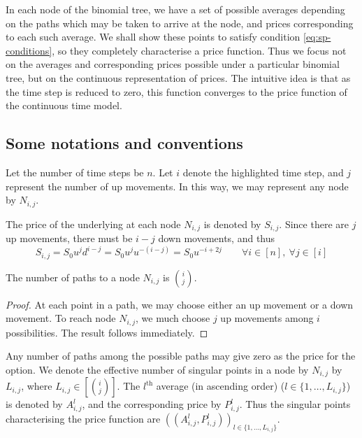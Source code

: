 In each node of the binomial tree, we have a set of possible averages depending on the paths which may be taken to arrive at the node, and prices corresponding to each such average. We shall show these points to satisfy condition \ref{eq:sp-conditions}, so they completely characterise a price function. Thus we focus not on the averages and corresponding prices possible under a particular binomial tree, but on the continuous representation of prices. The intuitive idea is that as the time step is reduced to zero, this function converges to the price function of the continuous time model.



\subsection{Some notations and conventions}
Let the number of time steps be $n$. Let $i$ denote the highlighted time step, and $j$ represent the number of up movements. In this way, we may represent any node by $ N_{i,j} $.

The price of the underlying at each node $ N_{i,j} $ is denoted by $ S_{i,j} $. Since there are $j$ up movements, there must be $ i-j $ down movements, and thus
\begin{equation} \label{eq:sp-am-ij}
S_{i,j} = S_0 u^{j} d^{i-j} = S_0 u^{j} u^{-(i-j)} = S_0 u^{-i+2j} \qquad \forall i \in [n], \ \forall j \in [i]
\end{equation}


\begin{prp}
	The number of paths to a node $ N_{i,j} $ is $ \binom{i}{j} $.
\end{prp}

\begin{proof}
	At each point in a path, we may choose either an up movement or a down movement. To reach node $ N_{i,j} $, we much choose $j$ up movements among $i$ possibilities. The result follows immediately.
\end{proof}

Any number of paths among the possible paths may give zero as the price for the option. We denote the effective number of singular points in a node by $ N_{i,j} $ by $ L_{i,j} $, where $ L_{i,j} \in \left[ \binom{i}{j} \right] $. The $ l^\mathrm{th} $ average (in ascending order) ($ l \in \{ 1, \dots, L_{i,j} \} $) is denoted by $ A_{i,j}^l $, and the corresponding price by $ P_{i,j}^l $. Thus the singular points characterising the price function are $ ( ( A_{i,j}^l, P_{i,j}^l ) )_{l \in \{ 1, \dots, L_{i,j} \} } $.

